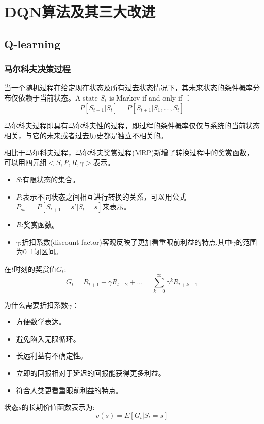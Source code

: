 \chapter{DQN算法及其三大改进}
\section{Q-learning}
\subsection{马尔科夫决策过程}
\begin{defn}[马尔科夫性]
  当一个随机过程在给定现在状态及所有过去状态情况下，其未来状态的条件概率分布仅依赖于当前状态。A state $S_t$ is Markov if and only if ：
  \begin{equation}
    P[S_{t+1}|S_t]=P[S_{t+1}|S_1,...,S_t]
  \end{equation}
\end{defn}

\begin{defn}[马尔科夫过程]
  马尔科夫过程即具有马尔科夫性的过程，即过程的条件概率仅仅与系统的当前状态相关，与它的未来或者过去历史都是独立不相关的。
\end{defn}
\begin{defn}[马尔科夫奖赏过程]
  相比于马尔科夫过程，马尔科夫奖赏过程(MRP)新增了转换过程中的奖赏函数，可以用四元组$<S,P,R,\gamma>$表示。
  \begin{itemize}
    \item $S$:有限状态的集合。
    \item $P$:表示不同状态之间相互进行转换的关系，可以用公式$P_{ss'}=P[S_{t+1}=s'|S_{t}=s]$来表示。
    \item $R$:奖赏函数。
    \item $\gamma$:折扣系数(discount factor)客观反映了更加看重眼前利益的特点,其中$\gamma$的范围为0~1闭区间。
  \end{itemize}
  \begin{defn}[奖赏函数]
    在$t$时刻的奖赏值$G_t$:
    \begin{equation}      
      G_t=R_{t+1}+\gamma R_{t+2}+...=\sum_{k=0}^\infty \gamma^k R_{t+k+1}
    \end{equation}
  \end{defn}
\end{defn}

为什么需要折扣系数$\gamma$：
\begin{itemize}
  \item 方便数学表达。
  \item 避免陷入无限循环。
  \item 长远利益有不确定性。
  \item 立即的回报相对于延迟的回报能获得更多利益。
  \item 符合人类更看重眼前利益的特点。
\end{itemize}
\begin{defn}[价值函数]
  状态$s$的长期价值函数表示为:
  \begin{equation}
    v(s)=E[G_t|S_t=s]
  \end{equation}
\end{defn}

